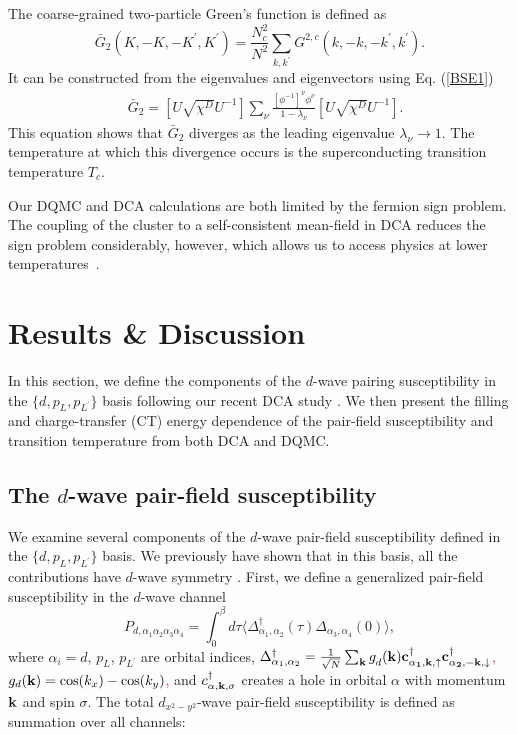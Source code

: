 \documentclass[reprint,nofootinbib,nobibnotes,amsmath,amssymb,aps,prb,floatfix]{revtex4-1}
\newcommand{\pdag}{{\phantom\dagger}}
\newcommand{\beq}{\begin{equation}}
\newcommand{\eeq}{\end{equation}}
\newcommand{\disp}[1]{Eq. (\ref{#1})}
\begin{document}
The coarse-grained two-particle Green's 
function is defined as 
\beq
\bar{G}_2(K,-K,-K^\prime,K^\prime) = \frac{N_c^2}{N^2}\sum_{k,k^\prime}G^{2,c}(k,-k,-k^\prime,k^\prime).
\label{cgG2}
\eeq
It can be constructed from the eigenvalues and eigenvectors using \disp{BSE1}
\beq
\begin{split}
&\bar{G}_{2}=
[U\sqrt{\chi^D}U^{-1}]\sum_{\nu}\frac{[\phi^{-1}]^{\nu}\phi^{\nu}}{1-\lambda_{\nu}}[U\sqrt{\chi^D}U^{-1}].\label{G2r}
\end{split}
\eeq
This equation shows that $\bar{G}_2$ diverges as the leading eigenvalue $\lambda_{\nu}\rightarrow 1$. The temperature at which this divergence occurs 
is the superconducting transition temperature $T_c$.  

Our DQMC and DCA calculations are both limited by the fermion sign problem. The coupling of the cluster to a self-consistent mean-field in DCA reduces the sign problem considerably, however, which allows us to access physics at lower temperatures~\cite{Maier1, Jarrell}.

\section{Results \& Discussion}
In this section, we define the components of the $d$-wave pairing susceptibility in the  $\{d,p_L,p_{L^\prime}\}$ basis following our recent DCA study \cite{Mai}. We then present the filling and charge-transfer (CT) energy dependence of the pair-field susceptibility and transition temperature from both DCA and DQMC. 

\subsection{The $d$-wave pair-field susceptibility}
We examine several components of the $d$-wave pair-field susceptibility defined in the $\{d,p_L,p_{L^\prime}\}$ basis. We previously have shown that in this basis, all the contributions have $d$-wave symmetry \cite{Mai}. 
First, we define a generalized pair-field susceptibility in the $d$-wave channel 
\beq
P_{d,\alpha_1\alpha_2\alpha_3\alpha_4}=\int_0^{\beta} d\tau\langle \Delta^{\dagger}_{\alpha_1,\alpha_2}(\tau) \Delta^\pdag_{\alpha_3,\alpha_4}(0) \rangle, \label{Pdall}
\eeq
where $\alpha_i=d$, $p_L$, $p_{L^\prime}$ are orbital indices, \textcolor{red}{ $\Delta^{\dagger}_{\alpha_1,\alpha_2}=\frac{1}{\sqrt{N}}\sum_{\bf k}g^{\phantom\dagger}_d(\bf{k})c^{\dagger}_{\alpha_1,\bf{k},\uparrow}c^{\dagger}_{\alpha_2,-\bf{k},\downarrow}$, $g_d({\bf k}) = \cos(k_x)-\cos(k_y)$,} and $c^{\dagger}_{\alpha,\bf{k},\sigma}$ creates a hole in orbital $\alpha$ with momentum ${\bf k}$ and spin $\sigma$.
The total $d_{x^2-y^2}$-wave pair-field susceptibility is defined as summation over all channels:
\end{document}
